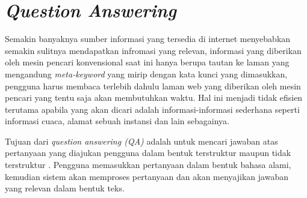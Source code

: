 \section{\textit{Question Answering}}
Semakin banyaknya sumber informasi yang tersedia di internet menyebabkan semakin sulitnya mendapatkan infromasi yang relevan, informasi yang diberikan oleh mesin pencari konvensional saat ini hanya berupa tautan ke laman yang mengandung \emph{meta-keyword} yang mirip dengan kata kunci yang dimasukkan, pengguna harus membaca terlebih dahulu laman web yang diberikan oleh mesin pencari yang tentu saja akan membutuhkan waktu. Hal ini menjadi tidak efisien terutama apabila yang akan dicari adalah informasi-informasi sederhana seperti informasi cuaca, alamat sebuah instansi dan lain sebagainya. 

Tujuan dari \emph{question answering (QA)} adalah untuk mencari jawaban atas pertanyaan yang diajukan pengguna dalam bentuk terstruktur maupun tidak terstruktur \citep*{moussa_kader}. Pengguna memasukkan pertanyaan dalam bentuk bahasa alami, kemudian sistem akan memproses pertanyaan dan akan menyajikan jawaban yang relevan dalam bentuk teks.

